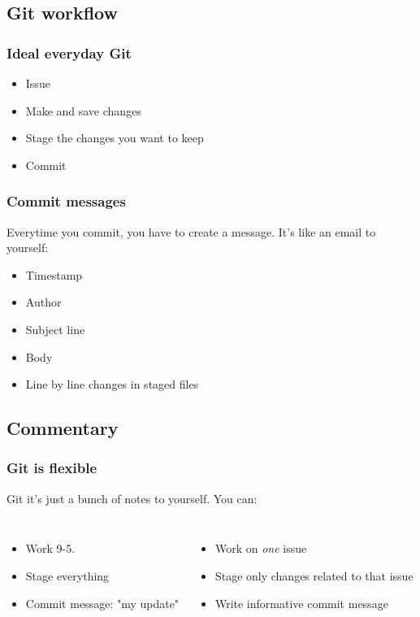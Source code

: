 \documentclass{beamer}
\begin{document}
\subsection{Git workflow}

\begin{frame}
    \frametitle{Ideal everyday Git}
    \begin{itemize}
        \item Issue
        \item Make and save changes
        \item Stage the changes you want to keep
        \item Commit
    \end{itemize}
\end{frame}

\begin{frame}
    \frametitle{Commit messages}
    Everytime you commit, you have to create a message. It's like an email to yourself:
    \begin{itemize}
        \item Timestamp
        \item Author
        \item Subject line
        \item Body
        \item Line by line changes in staged files
    \end{itemize}
\end{frame}

\subsection{Commentary}

\begin{frame}
    \frametitle{Git is flexible}
    Git it's just a bunch of notes to yourself. You can: \vspace{0.2cm}
    \begin{columns}
        \begin{itemize}
            \item Work 9-5. 
            \item Stage everything
            \item Commit message: "my update"
        \end{itemize}
        \begin{itemize}
            \item Work on \textit{one} issue
            \item Stage only changes related to that issue
            \item Write informative commit message
        \end{itemize}
    \end{columns}
\end{frame}
\end{document}
